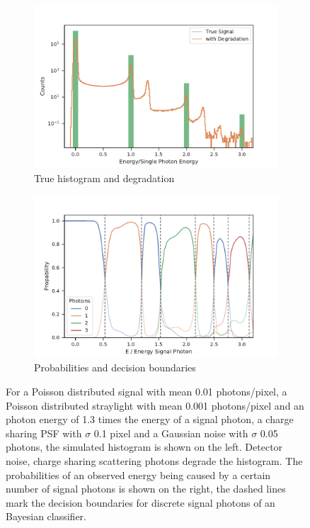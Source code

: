 \begin{figure}
	\centering
	\begin{subfigure}[b]{0.45\textwidth}
		\includegraphics[width=\linewidth]{images/sharing.pdf}
		\caption{True histogram and degradation}
		\label{fig:degrad}
	\end{subfigure}
	\begin{subfigure}[b]{0.45\textwidth}
		\includegraphics[width=\linewidth]{images/probs.pdf}
		\caption{Probabilities and decision boundaries}
		\label{fig:probs}
	\end{subfigure}
	
	\caption[Histogram, probabilities and decision boundaries for the photon number under the influence of charge sharing and noise]{For a Poisson distributed signal with mean 0.01 photons/pixel, a Poisson distributed straylight with mean 0.001 photons/pixel and an photon energy of 1.3 times the energy of a signal photon, a charge sharing PSF with $\sigma$ 0.1 pixel and a Gaussian noise with $\sigma$ 0.05 photons, the simulated histogram is shown on the left. Detector noise, charge sharing scattering photons degrade the histogram. The probabilities of an observed energy being caused by a certain number of signal photons is shown on the right, the dashed lines mark the decision boundaries for discrete signal photons of an Bayesian classifier.} 
\end{figure}


